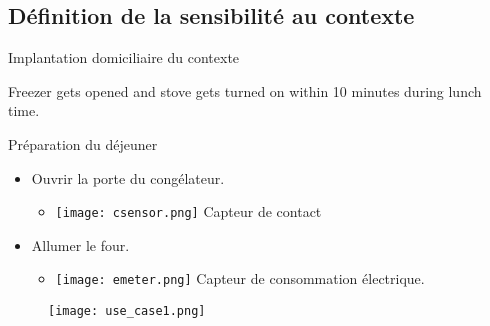 \subsection{Définition de la sensibilité au contexte}
\begin{frame}{Implantation domiciliaire du contexte}
  \begin{minipage}{.48\linewidth}
    \begin{coloredbox}[black]{}
      \begin{scriptsize}
        Freezer gets opened and stove gets turned on within 10 minutes during lunch time.
      \end{scriptsize}
    \end{coloredbox}
  \end{minipage}
  \hfill
  \begin{minipage}{.48\linewidth}
  \end{minipage}
  \vfill
  \begin{minipage}{0.45\linewidth}
    \begin{coloredbox}[teal]{Préparation du déjeuner}
\small
    \begin{itemize}
    \item Ouvrir la porte du congélateur.
      \begin{itemize}
      \item \texttt{[image: csensor.png]} Capteur de contact
      \end{itemize}
    \item Allumer le four.
      \begin{itemize}
      \item \texttt{[image: emeter.png]} Capteur de consommation électrique.
      \end{itemize}
    \end{itemize}
\end{coloredbox}
  \end{minipage}
  \hfill
  \begin{minipage}{0.50\linewidth}
    \begin{figure}
      \texttt{[image: use\_case1.png]}
    \end{figure}
  \end{minipage}
\end{frame}
